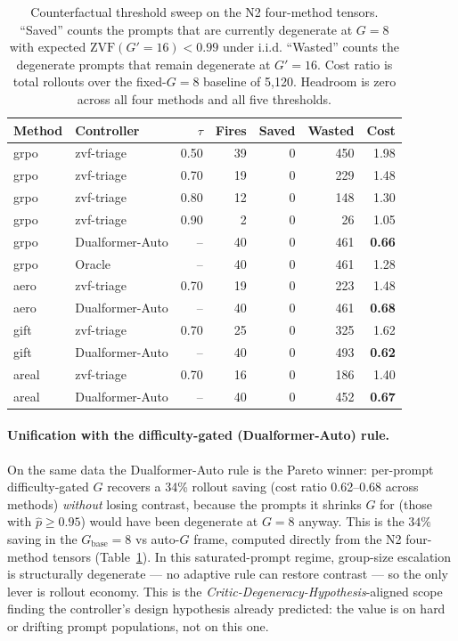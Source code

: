 \documentclass{article}
\begin{document}
\begin{table}[t]
\centering
\caption{Counterfactual threshold sweep on the N2 four-method tensors.
``Saved'' counts the prompts that are currently degenerate at
$G{=}8$ with expected $\mathrm{ZVF}(G'{=}16)<0.99$ under i.i.d.
``Wasted'' counts the degenerate prompts that remain degenerate at
$G'{=}16$. Cost ratio is total rollouts over the fixed-$G{=}8$ baseline
of 5{,}120. Headroom is zero across all four methods and all five
thresholds.}
\label{tab:p7-cf-sweep}
\begin{tabular}{llrrrrr}
\toprule
Method & Controller & $\tau$ & Fires & Saved & Wasted & Cost \\
\midrule
grpo  & zvf-triage     & 0.50 & 39 & 0 & 450 & 1.98 \\
grpo  & zvf-triage     & 0.70 & 19 & 0 & 229 & 1.48 \\
grpo  & zvf-triage     & 0.80 & 12 & 0 & 148 & 1.30 \\
grpo  & zvf-triage     & 0.90 &  2 & 0 &  26 & 1.05 \\
grpo  & Dualformer-Auto &  -- & 40 & 0 & 461 & \textbf{0.66} \\
grpo  & Oracle         &  -- & 40 & 0 & 461 & 1.28 \\
\midrule
aero  & zvf-triage     & 0.70 & 19 & 0 & 223 & 1.48 \\
aero  & Dualformer-Auto &  -- & 40 & 0 & 461 & \textbf{0.68} \\
gift  & zvf-triage     & 0.70 & 25 & 0 & 325 & 1.62 \\
gift  & Dualformer-Auto &  -- & 40 & 0 & 493 & \textbf{0.62} \\
areal & zvf-triage     & 0.70 & 16 & 0 & 186 & 1.40 \\
areal & Dualformer-Auto &  -- & 40 & 0 & 452 & \textbf{0.67} \\
\bottomrule
\end{tabular}
\end{table}

\paragraph{Unification with the difficulty-gated (Dualformer-Auto) rule.}
On the same data the Dualformer-Auto rule is the Pareto winner:
per-prompt difficulty-gated $G$ recovers a 34\% rollout saving
(cost ratio 0.62--0.68 across methods) \emph{without} losing contrast,
because the prompts it shrinks $G$ for (those with $\hat p \ge 0.95$)
would have been degenerate at $G{=}8$ anyway. This is the $34\%$
saving in the $G_{\text{base}}{=}8$ vs auto-$G$ frame, computed
directly from the N2 four-method tensors
(Table~\ref{tab:p7-cf-sweep}). In this saturated-prompt regime,
group-size escalation is structurally degenerate --- no adaptive
rule can restore contrast --- so the only lever is rollout economy.
This is the \emph{Critic-Degeneracy-Hypothesis}-aligned
scope finding the controller's design hypothesis already predicted:
the value is on hard or drifting prompt populations, not on this one.
\end{document}
